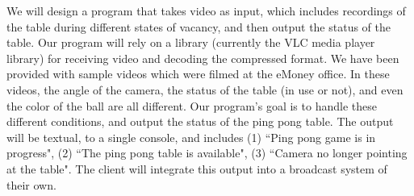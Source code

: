 \documentclass[11pt]{report}
\begin{document}
We will design a program that takes video as input, which includes recordings of the table during different states of vacancy, and then output the status of the table. Our program will rely on a library (currently the VLC media player library) for receiving video and decoding the compressed format. We have been provided with sample videos which were filmed at the eMoney office. In these videos, the angle of the camera, the status of the table (in use or not), and even the color of the ball are all different. Our program's goal is to handle these different conditions, and output the status of the ping pong table. The output will be textual, to a single console, and includes (1) ``Ping pong game is in progress", (2) ``The ping pong table is available", (3) ``Camera no longer pointing at the table".  The client will integrate this output into a broadcast system of their own.
\end{document}
